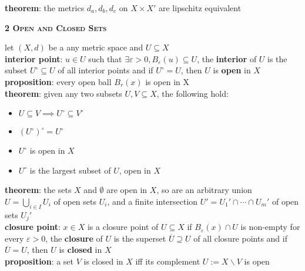 \documentclass[a4paper]{article}
\newcommand*\closure[1]{\overline{#1}}
\newcommand*\interior[1]{{#1}^\circ}
\begin{document}
\begin{multicols}{2}
\begin{framed}
	\noindent
	\textbf{theorem}: the metrics $d_a, d_b, d_c$ on $X \times X'$ are lipschitz equivalent
\end{framed}

\begin{framed}
	\begin{center}
		\textbf{\textsc{2 Open and Closed Sets}}
	\end{center}
	let $(X, d)$ be a any metric space and $U \subseteq X$\\
	
	\noindent
	\textbf{interior point}: $u \in U$ such that $\exists \varepsilon > 0, B_\varepsilon(u) \subseteq U$, the \textbf{interior} of $U$ is the subset $\interior{U} \subseteq U$ of all interior points and if $\interior{U} = U$, then $U$ is \textbf{open} in $X$\\
	
	\noindent
	\textbf{proposition}: every open ball $B_r(x)$ is open in X\\
	
	\noindent
	\textbf{theorem}: given any two subsets $U, V \subseteq X$, the following hold:
	
		\begin{itemize}
			\item $U \subseteq V \implies \interior{U} \subseteq \interior{V}$
			\item $\interior{(\interior{U})} = \interior{U}$
			\item $\interior{U}$ is open in $X$
			\item $\interior{U}$ is the largest subset of $U$, open in $X$
		\end{itemize}	

	
	\noindent
	\textbf{theorem}: the sets $X$ and $\emptyset$ are open in $X$, so are an arbitrary union $U = \bigcup_{i \in I} U_i$ of open sets $U_i$, and a finite intersection $U' = U_1' \cap \cdots \cap U_m'$ of open sets $U_j'$\\
	
	\noindent
	\textbf{closure point}: $x \in X$ is a closure point of $U \subseteq X$ if $B_\varepsilon(x) \cap U$ is non-empty for every $\varepsilon > 0$, the \textbf{closure} of $U$ is the superset $\closure{U} \supseteq U$ of all closure points and if $\closure{U} = U$, then $U$ is \textbf{closed} in $X$\\
	
	\noindent
	\textbf{proposition}: a set $V$ is closed in $X$ iff its complement $U := X \backslash V$ is open\\
	

\end{framed}
\end{multicols}
\end{document}
